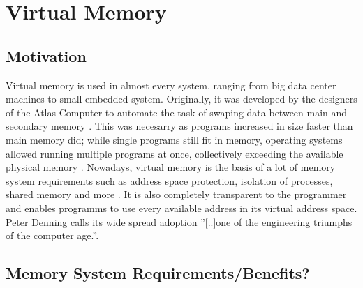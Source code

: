 \section{Virtual Memory}
\subsection{Motivation}
Virtual memory is used in almost every system, ranging from big data center machines to small embedded system.
Originally, it was developed by the designers of the Atlas Computer to automate the task of swaping data between
main and secondary memory \cite{denning1997before}.
This was necesarry as programs increased in size faster than main memory did; while single programs
still fit in memory, operating systems allowed running multiple programs at once, collectively exceeding
the available physical memory \cite{tanenbaumOS}.
Nowadays, virtual memory is the basis of a lot of memory system requirements such as address
space protection, isolation of processes, shared memory and more \cite{jacobSoftwaremanagedAddressTranslation1997}.
It is also completely transparent to the programmer and enables programms to use every available
address in its virtual address space.\\
Peter Denning calls its wide spread adoption ''[..]one of the engineering triumphs of the computer
age.''\cite{denning1997before}.
\subsection{Memory System Requirements/Benefits?}


